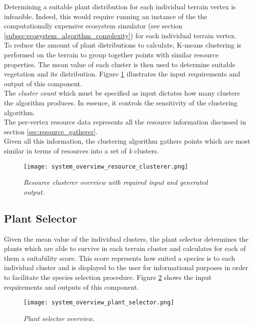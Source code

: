 Determining a suitable plant distribution for each individual terrain vertex is infeasible. Indeed, this would require running an instance of the the computationally expensive ecosystem simulator (see section \ref{subsec:ecosystem_algorithm_complexity}) for each individual terrain vertex.\\
To reduce the amount of plant distributions to calculate, K-means clustering is performed on the terrain to group together points with similar resource properties. The mean value of each cluster is then used to determine suitable vegetation and its distribution. Figure \ref{fig:system_overview_resoure_clusterer} illustrates the input requirements and output of this component.\\
The \textit{cluster count} which must be specified as input dictates how many clusters the algorithm produces. In essence, it controls the sensitivity of the clustering algorithm.\\
The per-vertex resource data represents all the resource information discussed in section \ref{sec:resource_gatherer}.\\
Given all this information, the clustering algorithm gathers points which are most similar in terms of resources into a set of \textit{k} clusters. \\

\begin{figure}
\center
	\texttt{[image: system\_overview\_resource\_clusterer.png]}
	\caption{ \textit{Resource clusterer overview with required input and generated output.}}	
	\label{fig:system_overview_resoure_clusterer}
\end{figure}

\subsection{Plant Selector}

Given the mean value of the individual clusters, the plant selector determines the plants which are able to survive in each terrain cluster and calculates for each of them a suitability score. This score represents how suited a species is to each individual cluster and is displayed to the user for informational purposes in order to facilitate the species selection procedure. Figure \ref{fig:system_overview_plant_selector} shows the input requirements and outputs of this component.

\begin{figure}
\center
	\texttt{[image: system\_overview\_plant\_selector.png]}
	\caption{ \textit{Plant selector overview.}}	
	\label{fig:system_overview_plant_selector}
\end{figure}

